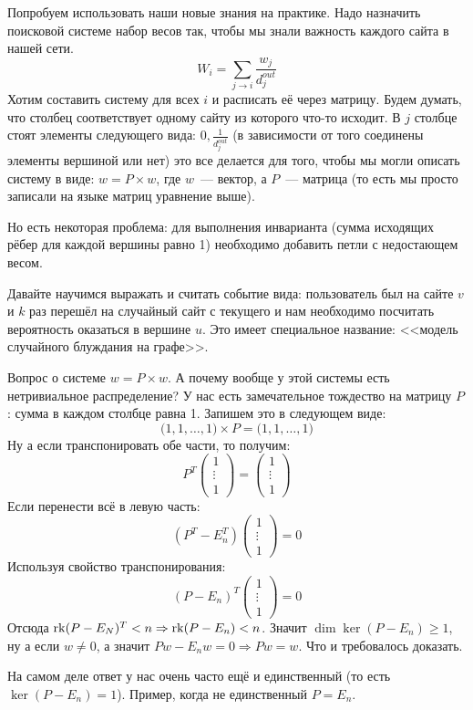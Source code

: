 \begin{example}
    Попробуем использовать наши новые знания на практике.
    Надо назначить поисковой системе набор весов так, чтобы
    мы знали важность каждого сайта в нашей сети.
    $$W_i = \sum_{j\rightarrow i} \frac{w_j}{d_j^{out}}$$
    Хотим составить систему для всех $i$ и расписать
    её через матрицу. Будем думать, что столбец соответствует
    одному сайту из которого что-то исходит. В $j$ столбце
    стоят элементы следующего вида: $0, \frac{1}{d^{out}_j}$
    (в зависимости от того соединены элементы вершиной или нет)
    это все делается для того, чтобы мы могли описать систему
    в виде: $w = P\times w$, где $w$~--- вектор, а $P$~--- матрица
    (то есть мы просто записали на языке матриц уравнение выше).

    Но есть некоторая проблема: для выполнения инварианта
    (сумма исходящих рёбер для каждой вершины равно 1) необходимо
    добавить петли с недостающем весом.

    Давайте научимся выражать и считать событие вида: 
    пользователь был на сайте $v$ и $k$ раз перешёл на случайный
    сайт с текущего и нам необходимо посчитать вероятность
    оказаться в вершине $u$. Это имеет специальное название:
    <<модель случайного блуждания на графе>>. 

    Вопрос о системе $w = P\times w$. А почему вообще у этой
    системы есть нетривиальное распределение? У нас есть
    замечательное тождество на матрицу $P$: сумма в каждом
    столбце равна 1. Запишем это в следующем виде:
    $$\big(1,1,\dots, 1\big)\times P = \big(1,1,\dots, 1\big)$$
    Ну а если транспонировать обе части, то получим:
    $$
    P^T\begin{pmatrix}
        1\\\vdots\\1
    \end{pmatrix} = 
    \begin{pmatrix}
        1\\\vdots\\1
    \end{pmatrix}
    $$
    Если перенести всё в левую часть:
    $$
    (P^T - E_n^T)\begin{pmatrix}
        1\\\vdots\\1
    \end{pmatrix} = 0
    $$
    Используя свойство транспонирования:
    $$
    (P - E_n)^T\begin{pmatrix}
        1\\\vdots\\1
    \end{pmatrix} = 0
    $$
    Отсюда $\operatorname{rk}(P - E_N)^T<n \Rightarrow \operatorname{rk}(P - E_n)<n$.
    Значит $\dim \ker(P - E_n) \ge 1$, ну а если $w\not=0$,
    а значит $Pw -  E_nw = 0\Rightarrow Pw = w$.
    Что и требовалось доказать.

    На самом деле ответ у нас очень часто ещё и единственный
    (то есть $\ker(P-E_n)=1$). Пример, когда не единственный $P = E_n$.
\end{example}
